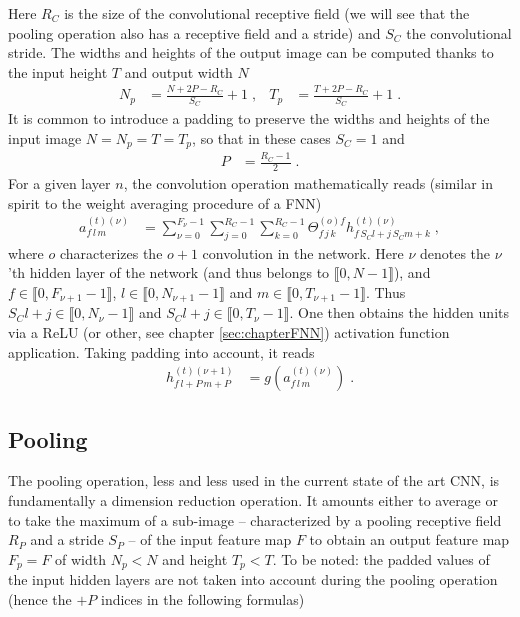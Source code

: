 Here $R_C$ is the size of the convolutional receptive field (we will see that the pooling operation also has a receptive field and a stride) and $S_C$ the convolutional stride. The widths and heights of the output image can be computed thanks to the input height $T$ and output width $N$
\begin{align}
N_p&=\frac{N+2P-R_C}{S_C}+1 \;,&
%
T_p&=\frac{T+2P-R_C}{S_C}+1\;.
\end{align}
It is common to introduce a padding to preserve the widths and heights of the input image $N=N_p=T=T_p$, so that in these cases $S_C=1$ and
\begin{align}
P&=\frac{R_C-1}{2}\;.
\end{align}
For a given layer $n$, the convolution operation mathematically reads (similar in spirit to the weight averaging procedure of a FNN)
\begin{align}
a_{f\,l\,m}^{(t)(\nu)}&=\sum^{F_\nu-1}_{\nu=0}\sum^{R_C-1}_{j=0}\sum^{R_C-1}_{k=0}
%
\Theta^{(o)f}_{f\,j\,k}h^{(t)(\nu)}_{f\,S_Cl+j\,S_Cm+k}\;,
\end{align}
where $o$ characterizes the $o+1$ convolution in the network. Here $\nu$ denotes the $\nu$'th hidden layer of the network (and thus belongs to $\llbracket0,N-1 \rrbracket$), and $f\in\llbracket0,F_{\nu+1}-1\rrbracket$, $l\in\llbracket0,N_{\nu+1}-1 \rrbracket$ and $m\in\llbracket0,T_{\nu+1}-1 \rrbracket$. Thus $S_Cl+j\in\llbracket0,N_\nu-1 \rrbracket$ and $S_Cl+j\in\llbracket0,T_\nu-1 \rrbracket$. One then obtains the hidden units via a ReLU (or other, see chapter \ref{sec:chapterFNN}) activation function application. Taking padding into account, it reads
\begin{align}
h_{f\,l+P\,m+P}^{(t)(\nu+1)}&=g\left(a_{f\,l\,m}^{(t)(\nu)}\right)\;.
\end{align}


\subsection{Pooling}

The pooling operation, less and less used in the current state of the art CNN, is fundamentally a dimension reduction operation. It amounts either to average or to take the maximum of a sub-image -- characterized by a pooling receptive field $R_P$ and a stride $S_P$ -- of the input feature map $F$ to obtain an output feature map $F_p=F$ of width $N_p<N$ and height $T_p<T$. To be noted: the padded values of the input hidden layers are not taken into account during the pooling operation (hence the $+P$ indices in the following formulas)


